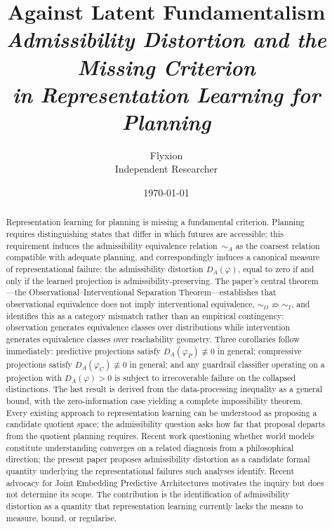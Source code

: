 \documentclass[11pt, a4paper]{article}
\title{%
  \textbf{Against Latent Fundamentalism}\\[0.5em]
  {\large\itshape Admissibility Distortion and the Missing Criterion\\
  in Representation Learning for Planning}%
}
\author{Flyxion\\
\small Independent Researcher}
\date{\today}
\theoremstyle{plain}
\theoremstyle{definition}
\theoremstyle{remark}
\newcommand{\simA}{\sim_A}
\newcommand{\simO}{\sim_O}
\newcommand{\simI}{\sim_I}
\newcommand{\DA}{D_A(\varphi)}
\begin{document}
\maketitle

\begin{abstract}
\noindent
Representation learning for planning is missing a fundamental criterion. Planning
requires distinguishing states that differ in which futures are accessible; this
requirement induces the admissibility equivalence relation~$\simA$ as the coarsest
relation compatible with adequate planning, and correspondingly induces a
canonical measure of representational failure: the admissibility distortion
$\DA$, equal to zero if and only if the learned projection is admissibility-preserving.
The paper's central theorem---the Observational--Interventional Separation
Theorem---establishes that observational equivalence does not imply interventional
equivalence, $\simO \not\Rightarrow \simI$, and identifies this as a category
mismatch rather than an empirical contingency: observation generates equivalence
classes over distributions while intervention generates equivalence classes over
reachability geometry. Three corollaries follow immediately: predictive projections
satisfy $D_A(\varphi_P) \not\equiv 0$ in general; compressive projections satisfy
$D_A(\varphi_C) \not\equiv 0$ in general; and any guardrail classifier operating
on a projection with $\DA > 0$ is subject to irrecoverable failure on the
collapsed distinctions. The last result is derived from the data-processing
inequality as a general bound, with the zero-information case yielding a complete
impossibility theorem. Every existing approach to representation learning can be
understood as proposing a candidate quotient space; the admissibility question
asks how far that proposal departs from the quotient planning requires.
Recent work questioning whether world models constitute understanding
\citep{gupta2025world} converges on a related diagnosis from a philosophical
direction; the present paper proposes admissibility distortion as a candidate
formal quantity underlying the representational failures such analyses identify. Recent advocacy for Joint
Embedding Predictive Architectures motivates the inquiry but does not determine
its scope. The contribution is the identification of admissibility distortion
as a quantity that representation learning currently lacks the means to measure,
bound, or regularise.
\end{abstract}

\newpage
\end{document}

